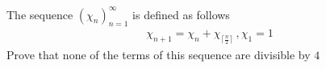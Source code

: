The sequence $(\chi_n) _{n=1}^{\infty}$ is defined as follows
\begin{align*} \chi_{n+1}=\chi_n  + \chi _{\lceil \frac{n}{2} \rceil} ~, \chi_1 =1 \end{align*}Prove that none of the terms of this sequence are divisible by $4$